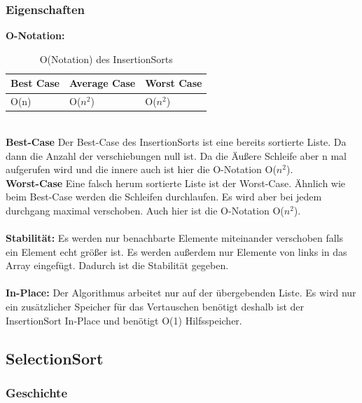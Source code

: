 \documentclass{article}
\begin{document}
\subsubsection{Eigenschaften}
\textbf{O-Notation:}
\begin{table}[h]
\centering
\begin{tabular}{lll}
	\hline
	\textbf{Best Case} & \textbf{Average Case} & \textbf{Worst Case} \\
	\hline
	O(n) & O($n^{2}$) & O($n^{2}$) \\
	\hline
\end{tabular}
\caption{O(Notation) des InsertionSorts \cite{India2015Dataset}}
\label{tab:InsertionSort}
\end{table}
\\
\textbf{Best-Case} Der Best-Case des InsertionSorts ist eine bereits sortierte Liste. Da dann die Anzahl der verschiebungen null ist. Da die Äußere Schleife aber n mal aufgerufen wird und die innere auch ist hier die O-Notation O($n^{2}$). \\
\textbf{Worst-Case} Eine falsch herum sortierte Liste ist der Worst-Case. Ähnlich wie beim Best-Case werden die Schleifen durchlaufen. Es wird aber bei jedem durchgang maximal verschoben. Auch hier ist die O-Notation O($n^{2}$).\\ \\
\textbf{Stabilität:}  Es werden nur benachbarte Elemente miteinander verschoben falls ein Element echt größer ist. Es werden außerdem nur Elemente von links in das Array eingefügt. Dadurch ist die Stabilität gegeben.\\ \\
\textbf{In-Place:}  Der Algorithmus arbeitet nur auf der übergebenden Liste. Es wird nur ein zusätzlicher Speicher für das Vertauschen benötigt deshalb ist der InsertionSort In-Place und benötigt  O(1) Hilfsspeicher. \cite{India2015Dataset}\\


\subsection{SelectionSort}
\subsubsection{Geschichte}
\end{document}
